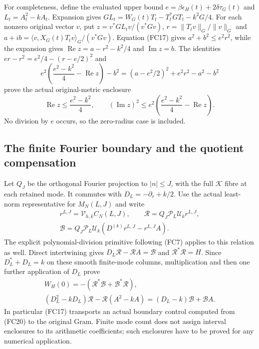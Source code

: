 \documentclass{article}
\begin{document}
For completeness, define the evaluated upper bound
$e=\beta\epsilon_H(t)+2\delta\tau_G(t)$ and $L_t=A_t^2-kA_t$.
Expansion gives $GL_t=W_G(t)T_t-T_t^*GT_t-k^2G/4$.
For each nonzero original vector $v$, put
$z=v^*GL_tv/(v^*Gv)$, $r=\|T_tv\|_G/\|v\|_G$ and
$a+ib=\langle v,X_G(t)T_tv\rangle_G/(v^*Gv)$.
Equation (FC17) gives $a^2+b^2\le e^2r^2$, while the expansion gives
$\operatorname{Re}z=a-r^2-k^2/4$ and $\operatorname{Im}z=b$.
The identities $er-r^2=e^2/4-(r-e/2)^2$ and
\[
 e^2\left(\frac{e^2-k^2}{4}-\operatorname{Re}z\right)-b^2
 =(a-e^2/2)^2+e^2r^2-a^2-b^2
\]
prove the actual original-metric enclosure
\[
 \operatorname{Re}z\le\frac{e^2-k^2}{4},\qquad
 (\operatorname{Im}z)^2\le e^2
       \left(\frac{e^2-k^2}{4}-\operatorname{Re}z\right).
 \tag{FC18}
\]
No division by $e$ occurs, so the zero-radius case is included.

\subsection{The finite Fourier boundary and the quotient compensation}

Let $Q_J$ be the orthogonal Fourier projection to $|n|\le J$, with
the full $\mathcal K$ fibre at each retained mode. It commutes with
$D_L=-\partial_r+k/2$. Use the actual least-norm representative for
$M_N(L,J)$ and write
\[
\begin{gathered}
 r^{L,J}=\mathcal V_{h,k}C_N(L,J),\qquad
 \mathscr R=Q_J\mathcal P_L\mathcal U_kr^{L,J},\\
 \mathscr B=Q_J\mathcal P_L\mathcal U_k
                (D^{(k)}r^{L,J}-r^{L,J}A).
\end{gathered}\tag{FC19}
\]
The explicit polynomial-division primitive following (FC7) applies
to this relation as well. Direct intertwining gives
$D_L\mathscr R-\mathscr RA=\mathscr B$ and $\mathscr R^*\mathscr R=H$.
Since $D_L^*+D_L=k$ on these smooth finite-mode columns, multiplication
and then one further application of $D_L$ prove
\[
\begin{gathered}
 W_H(0)=-(\mathscr R^*\mathscr B+\mathscr B^*\mathscr R),\\
 (D_L^2-kD_L)\mathscr R-\mathscr R(A^2-kA)
                    =(D_L-k)\mathscr B+\mathscr BA.
\end{gathered}\tag{FC20}
\]
In particular (FC17) transports an actual boundary control computed
from (FC20) to the original Gram. Finite mode count does not assign
interval enclosures to its arithmetic coefficients; such enclosures
have to be proved for any numerical application.
\end{document}
